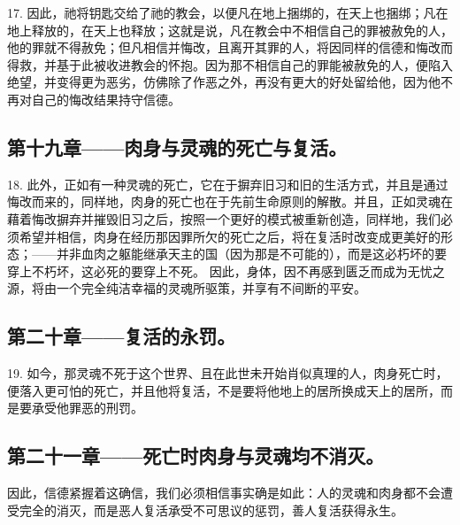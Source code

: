 17. 因此，祂将钥匙交给了祂的教会，以便凡在地上捆绑的，在天上也捆绑；凡在地上释放的，在天上也释放；这就是说，凡在教会中不相信自己的罪被赦免的人，他的罪就不得赦免；但凡相信并悔改，且离开其罪的人，将因同样的信德和悔改而得救，并基于此被收进教会的怀抱。因为那不相信自己的罪能被赦免的人，便陷入绝望，并变得更为恶劣，仿佛除了作恶之外，再没有更大的好处留给他，因为他不再对自己的悔改结果持守信德。\par


\subsection{第十九章——肉身与灵魂的死亡与复活。}

18. 此外，正如有一种灵魂的死亡，它在于摒弃旧习和旧的生活方式，并且是通过悔改而来的，同样地，肉身的死亡也在于先前生命原则的解散。并且，正如灵魂在藉着悔改摒弃并摧毁旧习之后，按照一个更好的模式被重新创造，同样地，我们必须希望并相信，肉身在经历那因罪所欠的死亡之后，将在复活时改变成更美好的形态；——并非血肉之躯能继承天主的国（因为那是不可能的），而是这必朽坏的要穿上不朽坏，这必死的要穿上不死。 因此，身体，因不再感到匮乏而成为无忧之源，将由一个完全纯洁幸福的灵魂所驱策，并享有不间断的平安。\par


\subsection{第二十章——复活的永罚。}

19. 如今，那灵魂不死于这个世界、且在此世未开始肖似真理的人，肉身死亡时，便落入更可怕的死亡，并且他将复活，不是要将他地上的居所换成天上的居所，而是要承受他罪恶的刑罚。\par


\subsection{第二十一章——死亡时肉身与灵魂均不消灭。}

因此，信德紧握着这确信，我们必须相信事实确是如此：人的灵魂和肉身都不会遭受完全的消灭，而是恶人复活承受不可思议的惩罚，善人复活获得永生。\par

